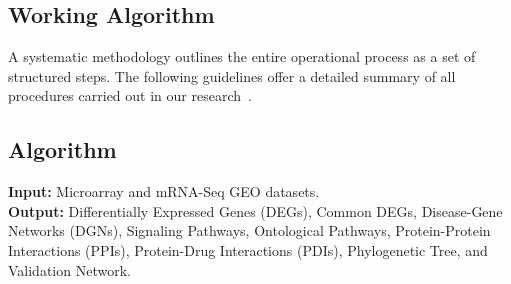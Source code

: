 \vspace*{-\parskip}
\subsection{Working Algorithm}
\label{sec:working_algorithm}

A systematic methodology outlines the entire operational process as a set of structured steps. The following guidelines offer a detailed summary of all procedures carried out in our research~\cite{algo_ref1}.

\vspace*{-\parskip}
\subsection{Algorithm}
\label{sec:algorithm}

\textbf{Input:} Microarray and mRNA-Seq GEO datasets. \\
\textbf{Output:} Differentially Expressed Genes (DEGs), Common DEGs, Disease-Gene Networks (DGNs), Signaling Pathways, Ontological Pathways, Protein-Protein Interactions (PPIs), Protein-Drug Interactions (PDIs), Phylogenetic Tree, and Validation Network.

